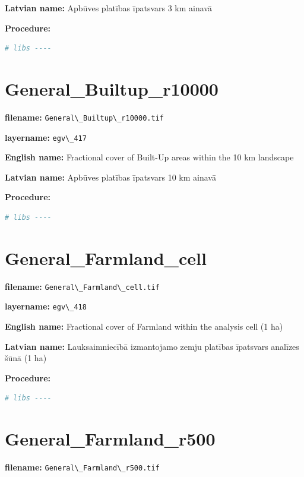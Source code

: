 \documentclass[
]{book}
\newcommand{\passthrough}[1]{#1}
\begin{document}
\textbf{Latvian name:} Apbūves platības īpatsvars 3 km ainavā

\textbf{Procedure:}

\begin{lstlisting}[language=R]
# libs ----
\end{lstlisting}

\section{General\_Builtup\_r10000}\label{ch06.417}

\textbf{filename:} \passthrough{\lstinline!General\_Builtup\_r10000.tif!}

\textbf{layername:} \passthrough{\lstinline!egv\_417!}

\textbf{English name:} Fractional cover of Built-Up areas within the 10 km landscape

\textbf{Latvian name:} Apbūves platības īpatsvars 10 km ainavā

\textbf{Procedure:}

\begin{lstlisting}[language=R]
# libs ----
\end{lstlisting}

\section{General\_Farmland\_cell}\label{ch06.418}

\textbf{filename:} \passthrough{\lstinline!General\_Farmland\_cell.tif!}

\textbf{layername:} \passthrough{\lstinline!egv\_418!}

\textbf{English name:} Fractional cover of Farmland within the analysis cell (1 ha)

\textbf{Latvian name:} Lauksaimniecībā izmantojamo zemju platības īpatsvars analīzes šūnā (1 ha)

\textbf{Procedure:}

\begin{lstlisting}[language=R]
# libs ----
\end{lstlisting}

\section{General\_Farmland\_r500}\label{ch06.419}

\textbf{filename:} \passthrough{\lstinline!General\_Farmland\_r500.tif!}
\end{document}
